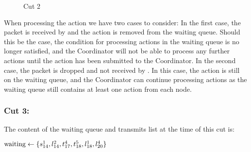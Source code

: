 
\begin{figure}[H]
    \centering

    \caption{Cut 2}\label{tikz:coordinatormsc2}
\end{figure}

When processing the  action we have two cases to consider: In the first case, the packet is received by  and the  action is removed from the waiting queue. Should this be the case, the condition for processing actions in the waiting queue is no longer satisfied, and the Coordinator will not be able to process any further actions until the  action has been submitted to the Coordinator. In the second case, the packet is dropped and not received by . In this case, the  action is still on the waiting queue, and the Coordinator can continue processing actions as the waiting queue still contains at least one action from each node.

\subsubsection{Cut 3:}

The content of the waiting queue and transmits list at the time of this cut is: \smallbreak

$\text{waiting} \leftarrow \{%
    \Action{s}{1}{14}, %
    \Action{l}{2}{14}, %
    \Action{t}{4}{17}, %
    \Action{t}{5}{18}, %
    \Action{l}{1}{18}, %
    \Action{l}{4}{20} %
    \}$

